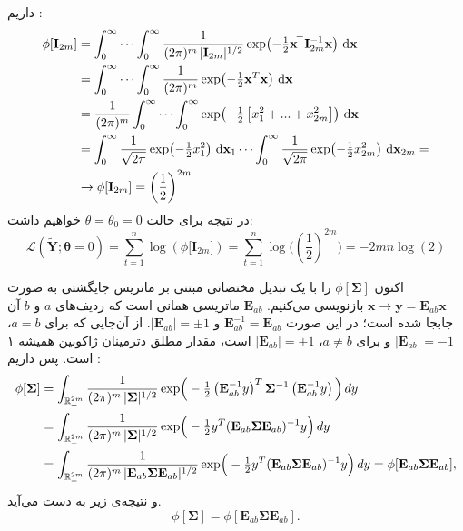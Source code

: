 \begin{اثبات}

داریم :
	\begin{align}
		\phi[\mathbf{I}_{2m}]
		&= \int_{0}^{\infty}\cdots\int_{0}^{\infty}
		\frac{1}{(2\pi)^m\,|\mathbf{I}_{2m}|^{1/2}}
		\exp\!\left(-\tfrac12\mathbf{x}^{\!\top}\mathbf{I}_{2m}^{-1}\mathbf{x}\right)\,\mathrm{d}\mathbf{x} \notag \\
		&=\int_{0}^{\infty}\cdots\int_{0}^{\infty}
		\frac{1}{(2\pi)^m}
		\exp\!\left(-\tfrac12\mathbf{x}^T\mathbf{x}\right)\,\mathrm{d}\mathbf{x} \notag \\
		&=\frac{1}{(2\pi)^m}\int_{0}^{\infty}\cdots\int_{0}^{\infty}
		\exp\!\left(-\tfrac12\left[x_1^2+...+x_{2m}^2\right]\right)\,\mathrm{d}\mathbf{x} \notag \\
		&=\int_{0}^{\infty}\frac{1}{\sqrt{2\pi}}
		\exp\!\left(-\tfrac12x_1^2\right)\,\mathrm{d}\mathbf{x}_1\cdots\int_{0}^{\infty}\frac{1}{\sqrt{2\pi}}
		\exp\!\left(-\tfrac12x_{2m}^2\right)\,\mathrm{d}\mathbf{x}_{2m}= \notag \\
		&\rightarrow\phi[\mathbf{I}_{2m}]=\left(\frac{1}{2}\right)^{2m}
	\end{align}
	در نتیجه برای حالت
	$\theta=\theta_0=0$
	خواهیم داشت:
	\begin{equation}
		\mathcal{L}(\tilde{\mathbf{Y}};\boldsymbol{\theta}=0)
		= \sum_{t=1}^n \log\left(\phi\bigl[\mathbf{I}_{2m}\bigr]\right)= \sum_{t=1}^n \log\bigl(\left(\frac{1}{2}\right)^{2m}\bigr)=-2mn\log\left(2\right)
	\end{equation}

	
	اکنون
	\(\phi[\mathbf{\Sigma}]\) 
	را با یک تبدیل مختصاتی مبتنی بر ماتریس جایگشتی به صورت
	\(\mathbf{x}\rightarrow\mathbf{y}=\mathbf{E}_{ab}\mathbf{x}\)
	 بازنویسی می‌کنیم.
	\(\mathbf{E}_{ab}\)
	 ماتریسی همانی است که ردیف‌های \(a\) و \(b\) آن جابجا شده است؛
	در این صورت
	\(\mathbf{E}_{ab}^{-1}=\mathbf{E}_{ab}\)
	و 
	\(|\mathbf{E}_{ab}|=\pm1\).
	از آن‌جایی که برای
	\(a=b\)، \(|\mathbf{E}_{ab}|=-1\) 
	 و برای
	\(a\neq b\)، \(|\mathbf{E}_{ab}|=+1\) 
	 است، مقدار مطلق دترمینان ژاکوبین همیشه ۱ است. پس داریم :
	\begin{align}
		\phi[\mathbf{\Sigma}]&=\int_{\mathbb{R}^{2m}_+}\frac{1}{(2\pi)^m\,|\mathbf{\Sigma}|^{1/2}}
		\exp\!\Big(-\tfrac{1}{2}\left(\mathbf{E}_{ab}^{-1}y\right)^{T}\mathbf{\Sigma}^{-1}\left(\mathbf{E}_{ab}^{-1}y\right)\Big)\,dy \notag \\
		&=\int_{\mathbb{R}^{2m}_+}\frac{1}{(2\pi)^m\,|\mathbf{\Sigma}|^{1/2}}
		\exp\!\Big(-\tfrac{1}{2}y^{T}(\mathbf{E}_{ab}\mathbf{\Sigma} \mathbf{E}_{ab})^{-1}y\Big)\,dy \notag \\
		&=\int_{\mathbb{R}^{2m}_+}\frac{1}{(2\pi)^m\,|\mathbf{E}_{ab}\mathbf{\Sigma} \mathbf{E}_{ab}|^{1/2}}
		\exp\!\Big(-\tfrac{1}{2}y^{T}(\mathbf{E}_{ab}\mathbf{\Sigma} \mathbf{E}_{ab})^{-1}y\Big)\,dy
		=\phi[\mathbf{E}_{ab}\mathbf{\Sigma} \mathbf{E}_{ab}],
	\end{align}
	و نتیجه‌ی زیر به دست می‌آید.
	\begin{equation}
	\phi[\mathbf{\Sigma}]=\phi[\mathbf{E}_{ab}\mathbf{\Sigma} \mathbf{E}_{ab}].
	\end{equation}
	

\end{اثبات}
